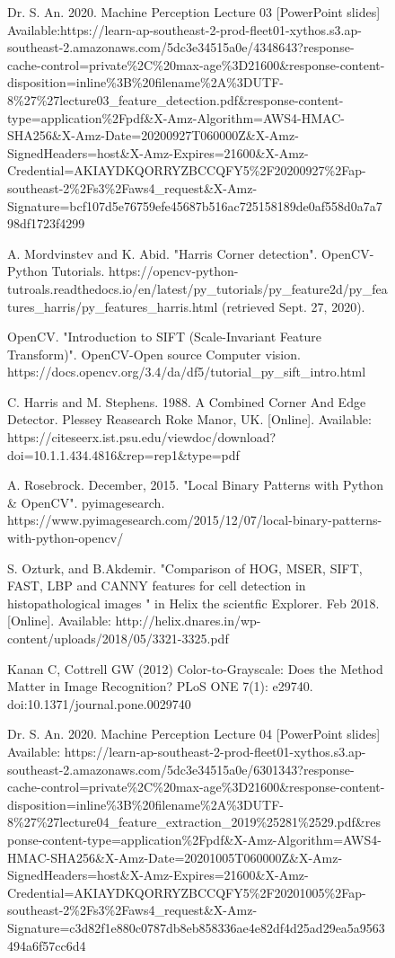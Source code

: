 \documentclass[conference]{IEEEtran}
\begin{document}
\newpage
\clearpage
\begin{figure}[!htb]
\begin{thebibliography}{00}

 Dr. S. An. 2020. Machine Perception Lecture 03 [PowerPoint slides] Available:https://learn-ap-southeast-2-prod-fleet01-xythos.s3.ap-southeast-2.amazonaws.com/5dc3e34515a0e/4348643?response-cache-control=private\%2C\%20max-age\%3D21600\&response-content-disposition=inline\%3B\%20filename\%2A\%3DUTF-8\%27\%27lecture03\_feature\_detection.pdf\&response-content-type=application\%2Fpdf\&X-Amz-Algorithm=AWS4-HMAC-SHA256\&X-Amz-Date=20200927T060000Z\&X-Amz-SignedHeaders=host\&X-Amz-Expires=21600\&X-Amz-Credential=AKIAYDKQORRYZBCCQFY5\%2F20200927\%2Fap-southeast-2\%2Fs3\%2Faws4\_request\&X-Amz-Signature=bcf107d5e76759efe45687b516ac725158189de0af558d0a7a798df1723f4299

A. Mordvinstev and K. Abid. "Harris Corner detection". OpenCV-Python Tutorials. https://opencv-python-tutroals.readthedocs.io/en/latest/py\_tutorials/py\_feature2d/py\_features\_harris/py\_features\_harris.html (retrieved Sept. 27, 2020).

OpenCV. "Introduction to SIFT (Scale-Invariant Feature Transform)". OpenCV-Open source Computer vision. https://docs.opencv.org/3.4/da/df5/tutorial\_py\_sift\_intro.html

C. Harris and M. Stephens. 1988. A Combined Corner And Edge Detector. Plessey Reasearch Roke Manor, UK. [Online]. Available: https://citeseerx.ist.psu.edu/viewdoc/download?doi=10.1.1.434.4816\&rep=rep1\&type=pdf

A. Rosebrock. December, 2015. "Local Binary Patterns with Python \& OpenCV". pyimagesearch. https://www.pyimagesearch.com/2015/12/07/local-binary-patterns-with-python-opencv/

 S. Ozturk, and B.Akdemir. "Comparison of HOG, MSER, SIFT, FAST, LBP and CANNY features for cell detection in histopathological images " in Helix the scientfic Explorer. Feb 2018. [Online]. Available: http://helix.dnares.in/wp-content/uploads/2018/05/3321-3325.pdf

 Kanan C, Cottrell GW (2012) Color-to-Grayscale: Does the Method Matter in Image Recognition? PLoS ONE 7(1): e29740. doi:10.1371/journal.pone.0029740

 Dr. S. An. 2020. Machine Perception Lecture 04 [PowerPoint slides] Available: https://learn-ap-southeast-2-prod-fleet01-xythos.s3.ap-southeast-2.amazonaws.com/5dc3e34515a0e/6301343?response-cache-control=private\%2C\%20max-age\%3D21600\&response-content-disposition=inline\%3B\%20filename\%2A\%3DUTF-8\%27\%27lecture04\_feature\_extraction\_2019\%25281\%2529.pdf\&response-content-type=application\%2Fpdf\&X-Amz-Algorithm=AWS4-HMAC-SHA256\&X-Amz-Date=20201005T060000Z\&X-Amz-SignedHeaders=host\&X-Amz-Expires=21600\&X-Amz-Credential=AKIAYDKQORRYZBCCQFY5\%2F20201005\%2Fap-southeast-2\%2Fs3\%2Faws4\_request\&X-Amz-Signature=c3d82f1e880c0787db8eb858336ae4e82df4d25ad29ea5a9563494a6f57cc6d4



\end{thebibliography}
\end{figure}
\end{document}
